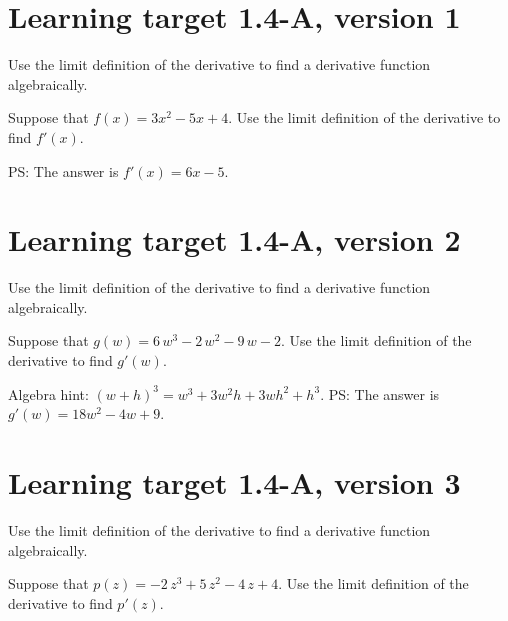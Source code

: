 
\usepackage{pgfplots}



\section{Learning target 1.4-A, version 1}

Use the limit definition of the derivative to find a derivative function algebraically.

\hrulefill

Suppose that $f(x) = 3x^2 - 5x + 4$. Use the limit definition of the derivative to find $f'(x)$. 

\vfill

PS: The answer is $f'(x) = 6x - 5$.
\pagebreak

\section{Learning target 1.4-A, version 2}

Use the limit definition of the derivative to find a derivative function algebraically.

\hrulefill

Suppose that  \(g(w) = 6 \, w^{3} - 2 \, w^{2} - 9 \, w - 2\). Use the limit definition of the derivative to find $g'(w)$.

\vspace{1em} 

Algebra hint: $(w+h)^3 = w^3 + 3w^2 h + 3w h^2 + h^3$.
\vfill
PS: The answer is $g'(w) = 18w^2 - 4w + 9.$


\pagebreak

\section{Learning target 1.4-A, version 3}

Use the limit definition of the derivative to find a derivative function algebraically.

\hrulefill

Suppose that  \(p(z) = -2 \, z^{3} +5 \, z^{2} - 4 \, z +4\). Use the limit definition of the derivative to find $p'(z)$.

\vspace{1em} 

